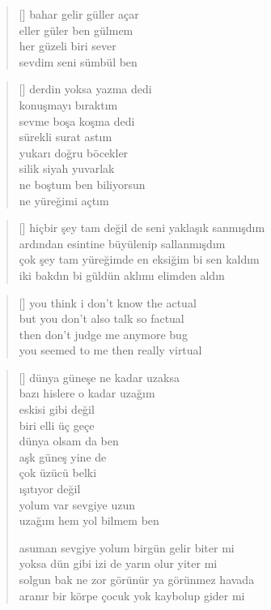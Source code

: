 \documentclass[a5paper, openright, twoside]{memoir}
\begin{document}
\begin{verse}[\versewidth]
  bahar gelir güller açar \\
  eller güler ben gülmem \\
  her güzeli biri sever \\
  sevdim seni sümbül ben
\end{verse}
\begin{verse}[\versewidth]
  derdin yoksa yazma dedi \\
  konuşmayı bıraktım \\
  sevme boşa koşma dedi \\
  sürekli surat astım \\
  yukarı doğru böcekler \\
  silik siyah yuvarlak \\
  ne boştum ben biliyorsun \\
  ne yüreğimi açtım
\end{verse}
\begin{verse}[\versewidth]
  hiçbir şey tam değil de seni yaklaşık sanmışdım \\
  ardından esintine büyülenip sallanmışdım \\
  çok şey tam yüreğimde en eksiğim bi sen kaldım \\
  iki bakdın bi güldün aklımı elimden aldın
\end{verse}
\begin{verse}[\versewidth]
  you think i don't know the actual \\
  but you don't also talk so factual \\
  then don't judge me anymore bug \\
  you seemed to me then really virtual
\end{verse}
\begin{verse}[\versewidth]
  dünya güneşe ne kadar uzaksa \\
  bazı hislere o kadar uzağım \\
  eskisi gibi değil \\
  biri elli üç geçe \\
  dünya olsam da ben \\
  aşk güneş yine de \\
  çok üzücü belki \\
  ışıtıyor değil \\
  yolum var sevgiye uzun \\
  uzağım hem yol bilmem ben

  asuman sevgiye yolum birgün gelir biter mi \\
  yoksa dün gibi izi de yarın olur yiter mi \\
  solgun bak ne zor görünür ya görünmez havada \\
  aranır bir körpe çocuk yok kaybolup gider mi
\end{verse}
\end{document}
